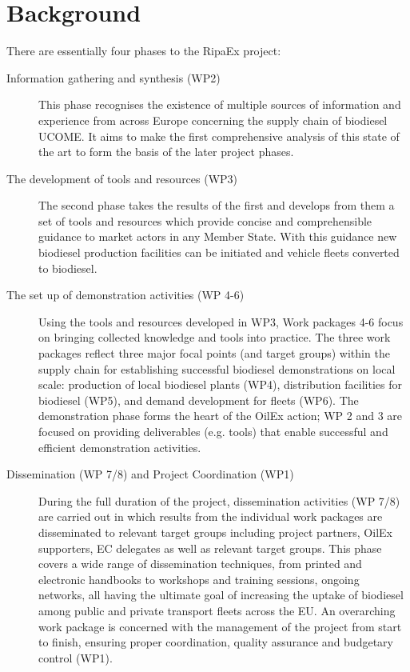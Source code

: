 \documentclass[11pt,fleqn]{book} %
\begin{document}
\section{Background}
\lipsum[1-2]

There are essentially four phases to the RipaEx project:
\begin{description}
	\item[Information gathering and synthesis (WP2)] This phase recognises the existence of multiple sources of information and experience from
    across Europe concerning the supply chain of biodiesel UCOME. It aims to make the first
    comprehensive analysis of this state of the art to form the basis of the later project phases.    
	\item[The development of tools and resources (WP3)] The second phase takes the results of the first and develops from them a set of tools and
    resources which provide concise and comprehensible guidance to market actors in any
    Member State. With this guidance new biodiesel production facilities can be initiated and
    vehicle fleets converted to biodiesel.    
    \item[The set up of demonstration activities (WP 4-6)] Using the tools and resources developed in WP3, Work packages 4-6 focus on bringing
    collected knowledge and tools into practice. The three work packages reflect three major
    focal points (and target groups) within the supply chain for establishing successful biodiesel
    demonstrations on local scale: production of local biodiesel plants (WP4), distribution
    facilities for biodiesel (WP5), and demand development for fleets (WP6). The demonstration
    phase forms the heart of the OilEx action; WP 2 and 3 are focused on providing
    deliverables (e.g. tools) that enable successful and efficient demonstration activities.    
    \item[Dissemination (WP 7/8) and Project Coordination (WP1)] During the full duration of the project, dissemination activities (WP 7/8) are carried out in
    which results from the individual work packages are disseminated to relevant target groups
    including project partners, OilEx supporters, EC delegates as well as relevant target
    groups. This phase covers a wide range of dissemination techniques, from printed and
    electronic handbooks to workshops and training sessions, ongoing networks, all having the
    ultimate goal of increasing the uptake of biodiesel among public and private transport fleets
    across the EU. An overarching work package is concerned with the management of the
    project from start to finish, ensuring proper coordination, quality assurance and budgetary
    control (WP1).
\end{description}
\end{document}
